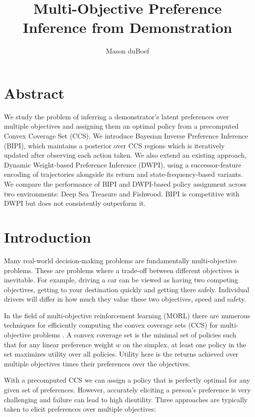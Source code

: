 \documentclass[11pt]{article}
\title{Multi-Objective Preference Inference from Demonstration}
\author{Mason duBoef}
\date{}
\begin{document}
\maketitle
\vspace{-2em}


\section*{Abstract}
We study the problem of inferring a demonstrator's latent preferences over multiple objectives and assigning them an optimal policy from a precomputed Convex Coverage Set (CCS). We introduce Bayesian Inverse Preference Inference (BIPI), which maintains a posterior over CCS regions which is iteratively updated after observing each action taken. We also extend an existing approach, Dynamic Weight-based Preference Inference (DWPI), using a successor-feature encoding of trajectories alongside its return and state-frequency-based variants. We compare the performance of BIPI and DWPI-based policy assignment across two environments: Deep Sea Treasure and Fishwood. BIPI is competitive with DWPI but does not consistently outperform it.

\section{Introduction}
Many real-world decision-making problems are fundamentally multi-objective problems. These are problems where a trade-off between different objectives is inevitable. For example, driving a car can be viewed as having two competing objectives, getting to your destination quickly and getting there safely. Individual drivers will differ in how much they value these two objectives, speed and safety.

In the field of multi-objective reinforcement learning (MORL) there are numerous techniques for efficiently computing the convex coverage sets (CCS) for multi-objective problems \cite{felten2023}. A convex coverage set is the minimal set of policies such that for any linear preference weight $w$ on the simplex, at least one policy in the set maximizes utility over all policies. Utility here is the returns achieved over multiple objectives times their preferences over the objectives.

With a precomputed CCS we can assign a policy that is perfectly optimal for any given set of preferences. However, accurately eliciting a person's preference is very challenging and failure can lead to high disutility. Three approaches are typically taken to elicit preferences over multiple objectives:
\end{document}
